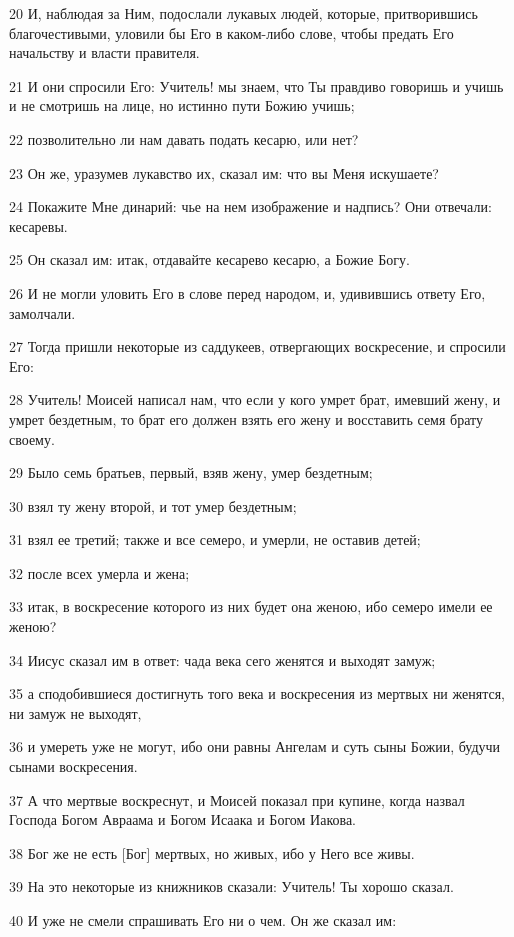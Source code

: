 \par 20 И, наблюдая за Ним, подослали лукавых людей, которые, притворившись благочестивыми, уловили бы Его в каком-либо слове, чтобы предать Его начальству и власти правителя.
\par 21 И они спросили Его: Учитель! мы знаем, что Ты правдиво говоришь и учишь и не смотришь на лице, но истинно пути Божию учишь;
\par 22 позволительно ли нам давать подать кесарю, или нет?
\par 23 Он же, уразумев лукавство их, сказал им: что вы Меня искушаете?
\par 24 Покажите Мне динарий: чье на нем изображение и надпись? Они отвечали: кесаревы.
\par 25 Он сказал им: итак, отдавайте кесарево кесарю, а Божие Богу.
\par 26 И не могли уловить Его в слове перед народом, и, удивившись ответу Его, замолчали.
\par 27 Тогда пришли некоторые из саддукеев, отвергающих воскресение, и спросили Его:
\par 28 Учитель! Моисей написал нам, что если у кого умрет брат, имевший жену, и умрет бездетным, то брат его должен взять его жену и восставить семя брату своему.
\par 29 Было семь братьев, первый, взяв жену, умер бездетным;
\par 30 взял ту жену второй, и тот умер бездетным;
\par 31 взял ее третий; также и все семеро, и умерли, не оставив детей;
\par 32 после всех умерла и жена;
\par 33 итак, в воскресение которого из них будет она женою, ибо семеро имели ее женою?
\par 34 Иисус сказал им в ответ: чада века сего женятся и выходят замуж;
\par 35 а сподобившиеся достигнуть того века и воскресения из мертвых ни женятся, ни замуж не выходят,
\par 36 и умереть уже не могут, ибо они равны Ангелам и суть сыны Божии, будучи сынами воскресения.
\par 37 А что мертвые воскреснут, и Моисей показал при купине, когда назвал Господа Богом Авраама и Богом Исаака и Богом Иакова.
\par 38 Бог же не есть [Бог] мертвых, но живых, ибо у Него все живы.
\par 39 На это некоторые из книжников сказали: Учитель! Ты хорошо сказал.
\par 40 И уже не смели спрашивать Его ни о чем. Он же сказал им:
